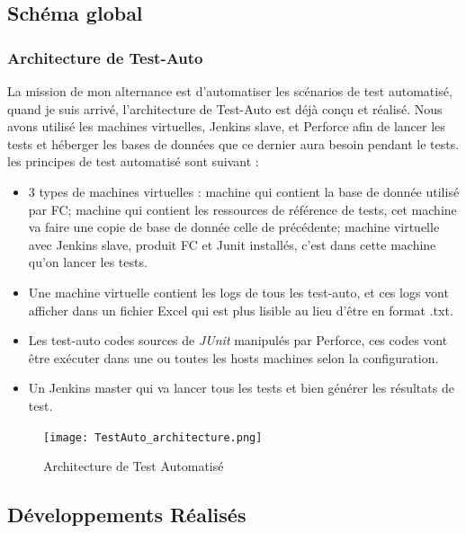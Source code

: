 \subsection{Schéma global}

    \subsubsection{Architecture de Test-Auto}
    La mission de mon alternance est d'automatiser les scénarios de test automatisé, quand je suis arrivé, l'architecture de Test-Auto est déjà conçu et réalisé. Nous avons utilisé les machines virtuelles, Jenkins slave, et Perforce afin de lancer les tests et héberger les bases de données que ce dernier aura besoin pendant le tests. les principes de test automatisé sont suivant : 
    \begin{itemize}
        \item 3 types de machines virtuelles : machine qui contient la base de donnée utilisé par FC; machine qui contient les ressources de référence de tests, cet machine va faire une copie de base de donnée celle de précédente; machine virtuelle avec Jenkins slave, produit FC et Junit installés, c'est dans cette machine qu'on lancer les tests.
        \item Une machine virtuelle contient les logs de tous les test-auto, et ces logs vont afficher dans un fichier Excel qui est plus lisible au lieu d'être en format .txt.
        \item Les test-auto codes sources de \textit{JUnit} manipulés par Perforce, ces codes vont être exécuter dans une ou toutes les hosts machines selon la configuration.
        \item Un Jenkins master qui va lancer tous les tests et bien générer les résultats de test.
    \end{itemize}
    \begin{figure}[H]
        \centering
        \texttt{[image: TestAuto\_architecture.png]}
        \caption{Architecture de Test Automatisé}
        \label{fig:Architec_testAuto}
    \end{figure}

\subsection{Développements Réalisés}
 
